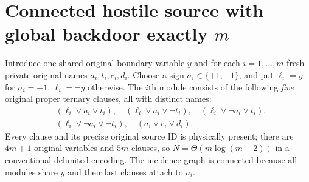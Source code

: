 \documentclass[11pt]{article}
\begin{document}
\section{Connected hostile source with global backdoor exactly $m$}
Introduce one shared original boundary variable $y$ and for each $i=1,\ldots,m$ fresh private original names $a_i,t_i,c_i,d_i$. Choose a sign $\sigma_i\in\{+1,-1\}$, and put $\ell_i=y$ for $\sigma_i=+1$, $\ell_i=\neg y$ otherwise. The $i$th module consists of the following \emph{five} original proper ternary clauses, all with distinct names:
\begin{align}\label{eq:five}
 &(\ell_i\vee a_i\vee t_i),\quad
 (\ell_i\vee a_i\vee\neg t_i),\quad
 (\ell_i\vee\neg a_i\vee t_i),\\[-2pt]
 &(\ell_i\vee\neg a_i\vee\neg t_i),\quad
 (a_i\vee c_i\vee d_i).\nonumber
\end{align}
Every clause and its precise original source ID is physically present; there are $4m+1$ original variables and $5m$ clauses, so $N=\Theta(m\log(m+2))$ in a conventional delimited encoding. The incidence graph is connected because all modules share $y$ and their last clauses attach to $a_i$.
\end{document}
